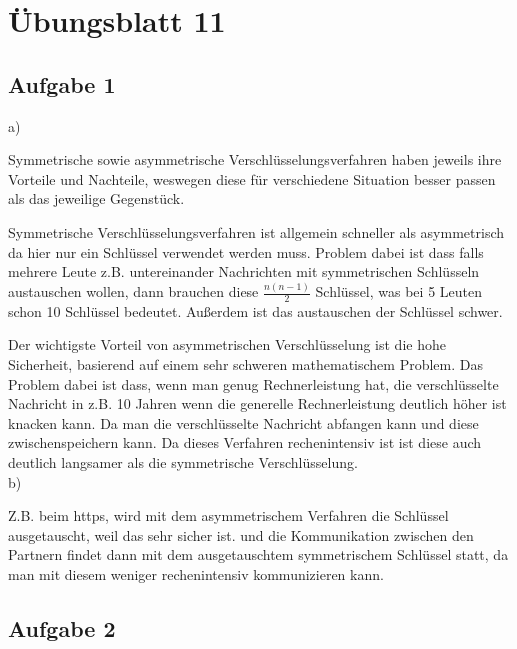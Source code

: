 \documentclass[12pt,a4paper,headsepline]{scrreprt}
\begin{document}


\section*{Übungsblatt 11}

\subsection*{Aufgabe 1}

a)

Symmetrische sowie asymmetrische Verschlüsselungsverfahren haben jeweils ihre Vorteile und Nachteile, weswegen diese für verschiedene Situation besser passen als das jeweilige Gegenstück.

Symmetrische Verschlüsselungsverfahren ist allgemein schneller als asymmetrisch da hier nur ein Schlüssel verwendet werden muss. Problem dabei ist dass falls mehrere Leute z.B. untereinander Nachrichten mit symmetrischen Schlüsseln austauschen wollen, dann brauchen diese $\frac{n(n-1)}{2}$ Schlüssel, was bei 5 Leuten schon 10 Schlüssel bedeutet. Außerdem ist das austauschen der Schlüssel schwer.

Der wichtigste Vorteil von asymmetrischen Verschlüsselung ist die hohe Sicherheit, basierend auf einem sehr schweren mathematischem Problem. Das Problem dabei ist dass, wenn man genug Rechnerleistung hat, die verschlüsselte Nachricht in z.B. 10 Jahren wenn die generelle Rechnerleistung deutlich höher ist knacken kann. Da man die verschlüsselte Nachricht abfangen kann und diese zwischenspeichern kann. Da dieses Verfahren rechenintensiv ist ist diese auch deutlich langsamer als die symmetrische Verschlüsselung.
\\

b)

Z.B. beim https, wird mit dem asymmetrischem Verfahren die Schlüssel ausgetauscht, weil das sehr sicher ist. und die Kommunikation zwischen den Partnern findet dann mit dem ausgetauschtem symmetrischem Schlüssel statt, da man mit diesem weniger rechenintensiv kommunizieren kann.
\\

\subsection*{Aufgabe 2}
\end{document}

